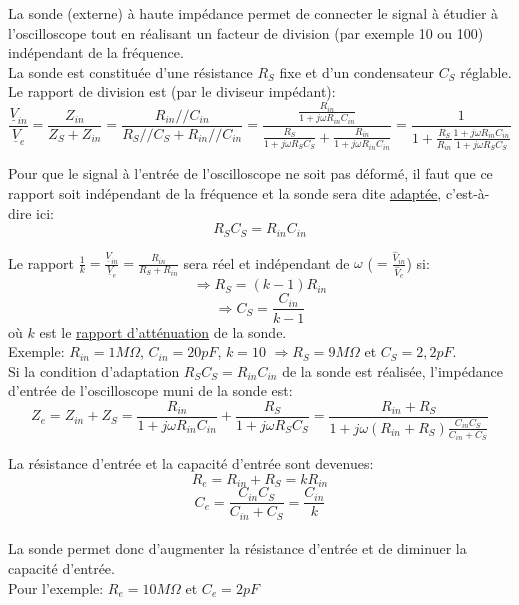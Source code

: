 {%
La sonde (externe) à haute impédance permet de connecter le signal à étudier à l’oscilloscope tout en réalisant un facteur de division (par exemple 10 ou 100) indépendant de la fréquence.\\
La sonde est constituée d’une résistance $R_S$ fixe et d’un condensateur $C_S$ réglable.\\

Le rapport de division est (par le diviseur impédant):\\
$$\frac{\underline{V}_{in}}{\underline{V}_e}=\frac{Z_{in}}{Z_S+Z_{in}}=\frac{R_{in}//C_{in}}{R_{S}//C_{S}+R_{in}//C_{in}}=\frac{\frac{R_{in}}{1+j\omega R_{in}C_{in}}}{\frac{R_{S}}{1+j\omega R_{S}C_{S}}+\frac{R_{in}}{1+j\omega R_{in}C_{in}}}=\frac{1}{1+\frac{R_S}{R_{in}}\frac{1+j\omega R_{in}C_{in}}{1+j\omega R_{S}C_S}}$$

Pour que le signal à l'entrée de l'oscilloscope ne soit pas déformé, il faut que ce rapport soit indépendant de la fréquence et la sonde sera dite \underline{adaptée}, c'est-à-dire ici:\\
$$R_SC_S=R_{in}C_{in}$$

Le rapport $\frac{1}{k}=\frac{\underline{V}_{in}}{\underline{V}_e}=\frac{R_{in}}{R_S+R_{in}}$ sera réel et indépendant de $\omega$ ($=\frac{\widehat{V}_{in}}{\widehat{V}_e}$) si:\\
$$\Rightarrow R_S=(k-1)R_{in}$$
$$\Rightarrow C_S=\frac{C_{in}}{k-1}$$
où $k$ est le \underline{rapport d'atténuation} de la sonde.\\

Exemple: $R_{in}=1M\Omega$, $C_{in}=20pF$, $k=10$ $\Rightarrow R_S=9M\Omega$ et $C_S=2,2pF$.\\

Si la condition d’adaptation $R_SC_S=R_{in}C_{in}$ de la sonde est réalisée, l’impédance d’entrée de l’oscilloscope muni de la sonde est:\\
$$Z_e=Z_{in}+Z_S=\frac{R_{in}}{1+j\omega R_{in}C_{in}}+\frac{R_{S}}{1+j\omega R_{S}C_{S}}=\frac{R_{in}+R_S}{1+j\omega (R_{in}+R_S) \frac{C_{in}C_S}{C_{in}+C_S}}$$

La résistance d'entrée et la capacité d'entrée sont devenues:\\
$$R_e=R_{in}+R_S=kR_{in}$$
$$C_e=\frac{C_{in}C_S}{C_{in}+C_S}=\frac{C_{in}}{k}$$\\

La sonde permet donc d'augmenter la résistance d'entrée et de diminuer la capacité d'entrée.\\

Pour l'exemple: $R_e=10M\Omega$ et $C_e=2pF$
}

